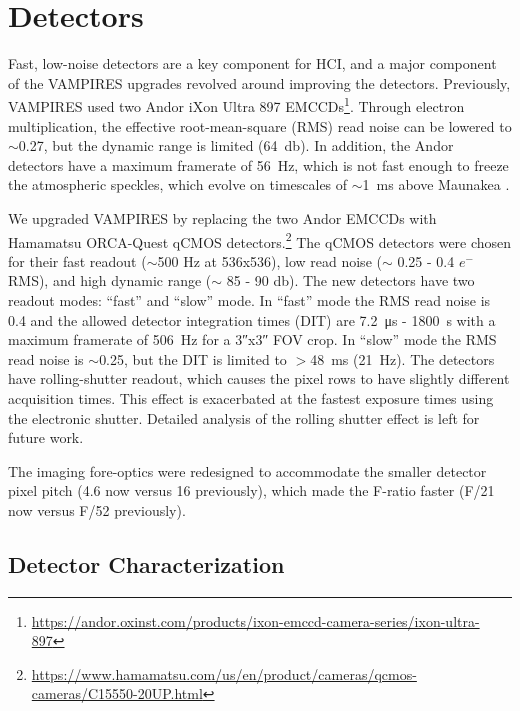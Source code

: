 \section{Detectors}\label{sec:detectors}

Fast, low-noise detectors are a key component for HCI, and a major component of the VAMPIRES upgrades revolved around improving the detectors. Previously, VAMPIRES used two Andor iXon Ultra 897 EMCCDs\footnote{\url{https://andor.oxinst.com/products/ixon-emccd-camera-series/ixon-ultra-897}}. Through electron multiplication, the effective root-mean-square (RMS) read noise can be lowered to $\sim$\SI{0.27}{\electron}, but the dynamic range is limited (\SI{64}{\decibel}). In addition, the Andor detectors have a maximum framerate of \SI{56}{\hertz}, which is not fast enough to freeze the atmospheric speckles, which evolve on timescales of $\sim$\SI{1}{\milli\second} above Maunakea \citep{kooten_climate_2022}. 

We upgraded VAMPIRES by replacing the two Andor EMCCDs with Hamamatsu ORCA-Quest qCMOS detectors.\footnote{\url{https://www.hamamatsu.com/us/en/product/cameras/qcmos-cameras/C15550-20UP.html}} The qCMOS detectors were chosen for their fast readout ($\sim$500 Hz at 536x536), low read noise ($\sim$ 0.25 - 0.4 $e^-$ RMS), and high dynamic range ($\sim$ 85 - 90 \si{\decibel}). The new detectors have two readout modes: ``fast'' and ``slow'' mode. In ``fast'' mode the RMS read noise is \SI{0.4}{\electron} and the allowed detector integration times (DIT) are \SI{7.2}{\micro\second} - \SI{1800}{\second} with a maximum framerate of \SI{506}{\hertz} for a \ang{;;3}x\ang{;;3} FOV crop. In ``slow'' mode the RMS read noise is $\sim$\SI{0.25}{\electron}, but the DIT is limited to $>$\SI{48}{\milli\second} (\SI{21}{\hertz}). The detectors have rolling-shutter readout, which causes the pixel rows to have slightly different acquisition times. This effect is exacerbated at the fastest exposure times using the electronic shutter. Detailed analysis of the rolling shutter effect is left for future work.

The imaging fore-optics were redesigned to accommodate the smaller detector pixel pitch (\SI{4.6}{\micron} now versus \SI{16}{\micron} previously), which made the F-ratio faster (F/21 now versus F/52 previously).

\subsection{Detector Characterization}

